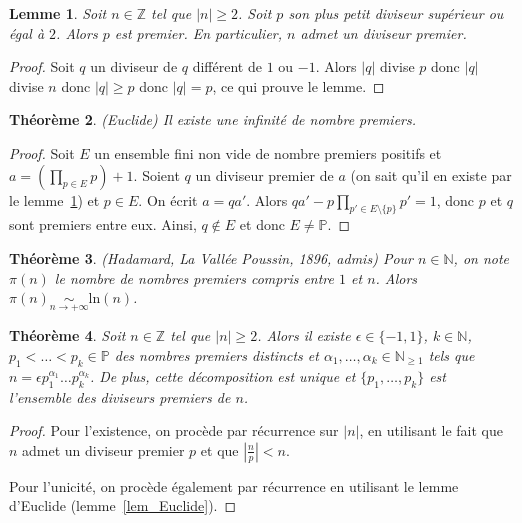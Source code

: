 \documentclass[12pt]{report}
\newtheorem{thm}{Théorème}[chapter]
\newtheorem{theoreme}[thm]{Théorème}
\newtheorem{Lem}[thm]{Lemme}
\newcommand{\N}{\mathbb{N}}
\newcommand{\Z}{\mathbb{Z}}
\begin{document}
\begin{Lem}\label{lemExistence_diviseur_premier}
Soit $n\in \Z$ tel que $|n|\geq 2$. Soit $p$ son plus petit diviseur supérieur ou égal à $2$. Alors $p$ est premier. En particulier, $n$ admet un diviseur premier.
\end{Lem}

\begin{proof}
Soit $q$ un diviseur de $q$ différent de $1$ ou $-1$. Alors $|q|$ divise $p$ donc $|q|$ divise $n$ donc $|q|\geq p$ donc $|q|=p$, ce qui prouve le lemme.
\end{proof}

\begin{theoreme}(Euclide)
Il existe une infinité de nombre premiers.
\end{theoreme}

\begin{proof}
Soit $E$ un ensemble fini non vide de nombre premiers positifs et $a=(\prod_{p\in E} p)+1$. Soient $q$ un diviseur premier de $a$ (on sait qu'il en existe par le lemme~\ref{lemExistence_diviseur_premier}) et $p\in E$. On écrit $a=qa'$.  Alors $qa'-p\prod_{p'\in E\setminus \{p\}} p'=1$, donc $p$ et $q$ sont premiers entre eux. Ainsi, $q\notin E$ et donc $E\neq \mathbb{P}$.
\end{proof}


\begin{theoreme}\label{thmHadamard_lavallee_poussin}(Hadamard, La Vallée Poussin, 1896, admis)
Pour $n\in \N$, on note $\pi(n)$ le nombre de nombres premiers compris entre $1$ et $n$. Alors $\pi(n)\underset{n\rightarrow +\infty}{\sim} \mathrm{ln}(n)$. 

\end{theoreme}

\begin{thm}\label{thmDécomposition_produit_facteurs_premiers}
Soit $n\in \Z$ tel que $|n|\geq 2$. Alors il existe $\epsilon\in \{-1,1\}$, $k\in \N$, $p_1<\ldots <p_k\in \mathbb{P}$ des nombres premiers distincts et $\alpha_1,\ldots,\alpha_k\in\N_{\geq 1}$ tels que $n=\epsilon p_1^{\alpha_1}\ldots p_k^{\alpha_k}$. De plus, cette décomposition est unique et $\{p_1,\ldots,p_k\}$ est l'ensemble des diviseurs premiers de $n$.
\end{thm}

\begin{proof}
Pour l'existence, on procède par récurrence sur $|n|$, en utilisant le fait que $n$ admet un diviseur premier $p$ et que $|\frac{n}{p}|<n$.

Pour l'unicité, on procède également par récurrence en utilisant le lemme d'Euclide (lemme~\ref{lem_Euclide}).
\end{proof}
\end{document}
